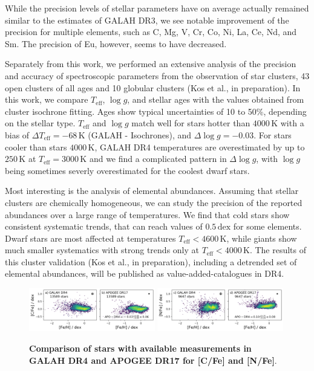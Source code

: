 \documentclass[
  journal=pasa,
  manuscript=research-paper, %
  year=2024,
  volume=37
]{cup-journal}
\newcommand{\Teff}{$T_\mathrm{eff}$\xspace}
\newcommand{\logg}{$\log g$\xspace}
\begin{document}
While the precision levels of stellar parameters have on average actually remained similar to the estimates of GALAH DR3, we see notable improvement of the precision for multiple elements, such as C, Mg, V, Cr, Co, Ni, La, Ce, Nd, and Sm. The precision of Eu, however, seems to have decreased.

Separately from this work, we performed an extensive analysis of the precision and accuracy of spectroscopic parameters from the observation of star clusters, 43 open clusters of all ages and 10 globular clusters (Kos et al., in preparation). In this work, we compare \Teff, \logg, and stellar ages with the values obtained from cluster isochrone fitting. Ages show typical uncertainties of 10 to 50\%, depending on the stellar type. \Teff and \logg match well for stars hotter than $4000\,\mathrm{K}$ with a bias of $\Delta T_\mathrm{eff}=-68\,\mathrm{K}$ (GALAH - Isochrones), and $\Delta \log g = -0.03$. For stars cooler than stars $4000\,\mathrm{K}$, GALAH DR4 temperatures are overestimated by up to $250\,\mathrm{K}$ at $T_\mathrm{eff} = 3000\,\mathrm{K}$ and we find a complicated pattern in $\Delta \log g$, with \logg being sometimes severly overestimated for the coolest dwarf stars. 

Most interesting is the analysis of elemental abundances. Assuming that stellar clusters are chemically homogeneous, we can study the precision of the reported abundances over a large range of temperatures. We find that cold stars show consistent systematic trends, that can reach values of $0.5\,\mathrm{dex}$ for some elements. Dwarf stars are most affected at temperatures $T_\mathrm{eff} < 4600\,\mathrm{K}$, while giants show much smaller systematics with strong trends only at $T_\mathrm{eff} < 4000\,\mathrm{K}$. The results of this cluster validation (Kos et al., in preparation), including a detrended set of elemental abundances, will be published as value-added-catalogues in DR4.

\begin{figure}[ht]
 \centering
 \includegraphics[width=0.49\textwidth]{figures/comparison_dr4_apo17_C_fe.png}
 \includegraphics[width=0.49\textwidth]{figures/comparison_dr4_apo17_N_fe.png}
 \caption{\textbf{Comparison of stars with available measurements in GALAH DR4 and APOGEE DR17 for [C/Fe] and [N/Fe]}.}
 \label{fig:comparison_dr4_apo17}
\end{figure}
\end{document}
